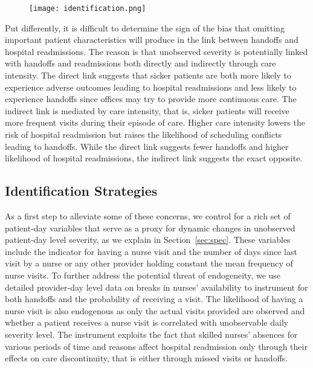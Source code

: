 \documentclass[final,12pt, notitlepage]{article}
\begin{document}
\graphicspath{ {/Users/kunheekim/Dropbox/Wharton/Research/Labor/gph/anhandoff/} }
\begin{figure}[H]
\centering
\texttt{[image: identification.png]}
\footnotesize
\label{fig:identification}
\end{figure}
Put differently, it is difficult to determine the sign of the bias that omitting important patient characteristics will produce in the link between handoffs and hospital readmissions. The reason is that unobserved severity is potentially linked with handoffs and readmissions both directly and indirectly through care intensity. The direct link suggests that sicker patients are both more likely to experience adverse outcomes leading to hospital readmissions and less likely to experience handoffs since offices may try to provide more continuous care.
The indirect link is mediated by care intensity, that is, sicker patients will receive more frequent visits during their episode of care. Higher care intensity lowers the risk of hospital readmission but raises the likelihood of scheduling conflicts leading to handoffs. While the direct link suggests fewer handoffs and higher likelihood of hospital readmissions, the indirect link suggests the exact opposite.

\subsection{Identification Strategies} \label{sec:id_strategies}
As a first step to alleviate some of these concerns, we control for a rich set of patient-day variables that serve as a proxy for dynamic changes in unobserved patient-day level severity, as we explain in Section~\ref{sec:spec}.
These variables include the indicator for having a nurse visit and the number of days since last visit by a nurse or any other provider holding constant the mean frequency of nurse visits.
To further address the potential threat of endogeneity, we use detailed provider-day level data on breaks in nurses' availability to instrument for both handoffs and the probability of receiving a visit. The likelihood of having a nurse visit is also endogenous as only the actual visits provided are observed and whether a patient receives a nurse visit is correlated with unobservable daily severity level.
The instrument exploits the fact that skilled nurses' absences for various periods of time and reasons affect hospital readmission only through their effects on care discontinuity, that is either through missed visits or handoffs.
\end{document}
